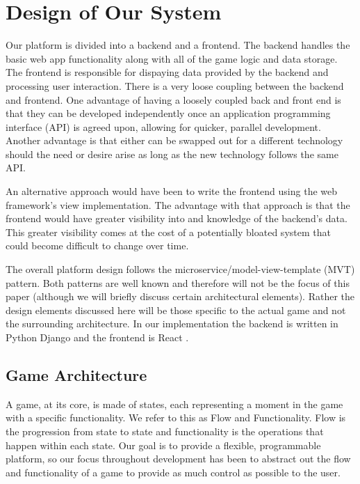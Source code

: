 \documentclass{article}
\begin{document}
\section{Design of Our System}
    Our platform is divided into a backend and a frontend. The backend handles the basic web app functionality along with all of the game logic and data storage. The frontend is responsible for dispaying data provided by the backend and processing user interaction. There is a very loose coupling between the backend and frontend. One advantage of having a loosely coupled back and front end is that they can be developed independently once an application programming interface (API) is agreed upon, allowing for quicker, parallel development. Another advantage is that either can be swapped out for a different technology should the need or desire arise as long as the new technology follows the same API.
    \smallskip
    
    An alternative approach would have been to write the frontend using the web framework's view implementation. The advantage with that approach is that the frontend would have greater visibility into and knowledge of the backend's data. This greater visibility comes at the cost of a potentially bloated system that could become difficult to change over time.
    \smallskip
    
    The overall platform design follows the microservice/model-view-template (MVT) pattern. Both patterns are well known and therefore will not be the focus of this paper (although we will briefly discuss certain architectural elements). Rather the design elements discussed here will be those specific to the actual game and not the surrounding architecture. In our implementation the backend is written in Python Django \cite{django} and the frontend is React \cite{react}.

	\subsection{Game Architecture}\label{architecture}
	    A game, at its core, is made of states, each representing a moment in the game with a specific functionality. We refer to this as Flow and Functionality. Flow is the progression from state to state and functionality is the operations that happen within each state. Our goal is to provide a flexible, programmable platform, so our focus throughout development has been to abstract out the flow and functionality of a game to provide as much control as possible to the user.
\end{document}
